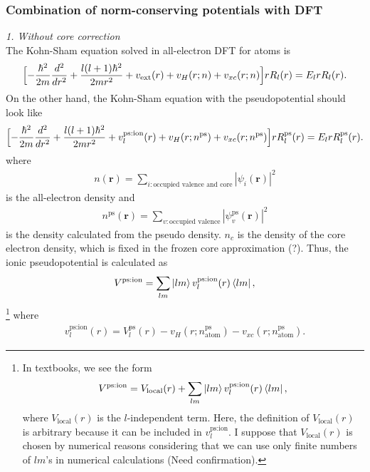 \documentclass{article}
\begin{document}
\subsubsection{Combination of norm-conserving potentials with DFT}
\noindent
\emph{1. Without core correction}\\
The Kohn-Sham equation solved in all-electron DFT for atoms is 
\begin{align}
  \Bigl[
    - \frac{\hbar^2}{2m} \frac{d^2}{dr^2} + \frac{l(l+1)\hbar^2}{2mr^2} +  v_{\text{ext}}(r) + v_H(r;n) + v_{xc}(r;n)
  \Bigr] rR_l(r) = E_l r R_l(r).
\end{align}
On the other hand, the Kohn-Sham equation with the pseudopotential should look like
\begin{align}
  \Bigl[
    - \frac{\hbar^2}{2m} \frac{d^2}{dr^2} + \frac{l(l+1)\hbar^2}{2mr^2} +  v^{\text{ps:ion}}_l(r) + v_H(r;n^{\text{ps}}) + v_{xc}(r;n^{\text{ps}})
  \Bigr] rR^{\text{ps}}_l(r) = E_l r R^{\text{ps}}_l(r).
\end{align}
where
\begin{align}
  n(\bm{r}) = \sum_{i: \text{occupied valence and core}} |\psi_i (\bm{r}) |^2
\end{align}
is the all-electron density and 
\begin{align}
  n^{\text{ps}}(\bm{r}) = \sum_{v: \text{occupied valence}} |\psi_v^{\text{ps}} (\bm{r}) |^2
\end{align}
is the density calculated from the pseudo density.
$n_c$ is the density of the core electron density, which is fixed in the frozen core approximation (?).
Thus, the ionic pseudopotential is calculated as 
\begin{align}
  V^{\text{ps:ion}} = \sum_{lm} \ket{lm} v^{\text{ps:ion}}_l(r)  \bra{lm},
\end{align}
\footnote{In textbooks, we see the form
\begin{align}
  V^{\text{ps:ion}} = V_{\text{local}}(r) + \sum_{lm} \ket{lm} v^{\text{ps:ion}}_l(r)  \bra{lm},
\end{align}
where $V_{\text{local}}(r) $ is the $l$-independent term.
Here, the definition of $V_{\text{local}}(r)$ is arbitrary because it can be included in $v^{\text{ps:ion}}_l$.
I suppose that  $V_{\text{local}}(r)$ is chosen by numerical reasons considering that we can use only finite numbers of $lm$'s in numerical calculations (Need confirmation).
}
where 
\begin{align}
  v^{\text{ps:ion}}_{l}(r) = V^{\text{ps}}_l(r) - v_H(r;n^{\text{ps}}_{\text{atom}}) - v_{xc}(r;n^{\text{ps}}_{\text{atom}}).
\end{align}
\end{document}
